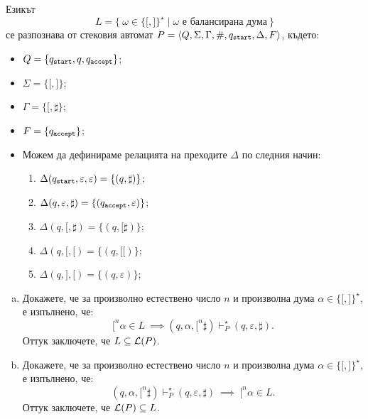 \begin{example}
  Езикът
  \[L = \{\ \omega \in \{\texttt{[},\texttt{]}\}^\star \mid \omega\text{ е балансирана дума}\ \}\]
  се разпознава от стековия автомат $P = \langle{Q,\Sigma,\Gamma,\#,q_{\texttt{start}},\Delta,F}\rangle$, където:
  \begin{itemize}
  \item 
    $Q = \{q_{\texttt{start}},q,q_{\texttt{accept}}\}$;
  \item
    $\Sigma = \{\texttt{[},\texttt{]}\}$;
  \item
    $\Gamma = \{\texttt{[}, \sharp\}$;
  \item
    $F = \{q_{\texttt{accept}}\}$;
  \item
    Можем да дефинираме релацията на преходите $\Delta$ по следния начин:
    \begin{enumerate}[(1)]
    \item
      $\Delta(q_{\texttt{start}},\varepsilon,\varepsilon) = \{(q,\sharp)\}$;
    \item 
      $\Delta(q, \varepsilon, \sharp) = \{(q_{\texttt{accept}}, \varepsilon)\}$;
    \item
      $\Delta(q, \texttt{[}, \sharp) = \{(q, \texttt{[}\sharp)\}$;
    \item
      $\Delta(q, \texttt{[}, \texttt{[}) = \{(q, \texttt{[[})\}$;
    \item
      $\Delta(q, \texttt{]}, \texttt{[}) = \{(q, \varepsilon)\}$;
    \end{enumerate}
  \end{itemize}  
  \begin{enumerate}[(a)]
  \item
    Докажете, че за произволно естествено число $n$ и произволна дума $\alpha \in \{\texttt{[}, \texttt{]}\}^\star$, 
    е изпълнено, че:
    \[\texttt{[}^n\alpha \in L\ \implies (q, \alpha, \texttt{[}^n\sharp) \vdash^\star_P (q, \varepsilon, \sharp).\]
    Оттук заключете, че $L \subseteq \mathcal{L}(P)$.
  \item
    Докажете, че за произволно естествено число $n$ и произволна дума $\alpha \in \{\texttt{[}, \texttt{]}\}^\star$, е изпълнено, че:
    \[(q,\alpha,\texttt{[}^n\sharp) \vdash^\star_P (q, \varepsilon, \sharp)\ \implies\ \texttt{[}^n\alpha \in L.\]
    Оттук заключете, че $\mathcal{L}(P) \subseteq L$.
  \end{enumerate}
\end{example}


